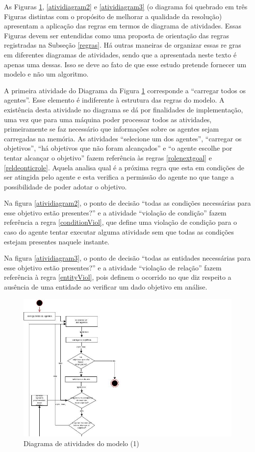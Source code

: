 As Figuras \ref{atividiagram1}, \ref{atividiagram2} e \ref{atividiagram3} (o diagrama foi quebrado em três Figuras distintas com o propósito de melhorar a qualidade da resolução)  apresentam a aplicação das regras em termos de diagrama de atividades. Essas Figuras devem ser entendidas como uma proposta de orientação das regras registradas na Subseção \ref{regras}. Há outras maneiras de organizar essas re  gras em diferentes diagramas de atividades, sendo que a apresentada neste texto é apenas uma dessas. Isso se deve ao fato de que esse estudo pretende fornecer um modelo e não um algoritmo. 

A primeira atividade do Diagrama da Figura \ref{atividiagram1} corresponde a ``carregar todos os agentes''. Esse elemento é indiferente à estrutura das regras do modelo. A existência desta atividade no diagrama se dá por finalidades de implementação, uma vez que para uma máquina poder processar todos as atividades, primeiramente se faz necessário que informações sobre os agentes sejam carregadas na memória. As atividades ``selecione um dos agentes'', ``carregar os objetivos'', ``há objetivos que não foram alcançados'' e ``o agente escolhe por tentar alcançar o objetivo'' fazem referência às regras \ref{rolenextgoal} e \ref{reldeonticrole}. Aquela analisa qual é a próxima regra que esta em condições de ser atingida pelo agente e esta verifica a permissão do agente no que tange a possibilidade de poder adotar o objetivo. 

Na figura \ref{atividiagram2}, o ponto de decisão ``todas as condições necessárias para esse objetivo estão presentes?'' e a atividade ``violação de condição'' fazem referência a regra \ref{conditionViol}, que define uma violação de condição para o caso do agente tentar executar alguma atividade sem que todas as condições estejam presentes naquele instante.

Na figura \ref{atividiagram3}, o ponto de decisão ``todas as entidades necessárias para esse objetivo estão presentes?'' e a atividade ``violação de relação'' fazem referência à regra \ref{entityViol}, pois definem o ocorrido no que diz respeito a ausência de uma entidade ao verificar um dado objetivo em análise. 

\begin{figure}[H]
  \centering
  \includegraphics[width=1.5\linewidth]{figure/diag1.jpg} 
  \caption{Diagrama de atividades do modelo (1)}
  \label{atividiagram1}
\end{figure}


